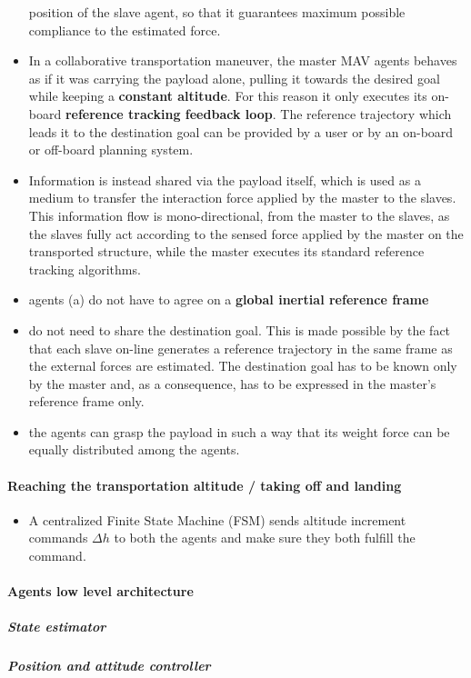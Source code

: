\documentclass{article}
\begin{document}
\begin{itemize}
			position of the slave agent, so that it guarantees maximum possible compliance to the estimated force.
			\item In a collaborative transportation maneuver, the master MAV agents behaves as if it was carrying the payload
			alone, pulling it towards the desired goal while keeping a \textbf{constant altitude}. For this reason it only executes its on-board \textbf{reference tracking feedback loop}. The reference trajectory which leads it to the destination goal can be provided by a user or by an on-board or off-board planning system.
			\item Information is instead shared via the payload itself, which is used as a medium to transfer the interaction force
			applied by the master to the slaves. This information flow is mono-directional, from the master to the slaves, as the slaves
			fully act according to the sensed force applied by the master on the transported structure, while the master executes its
			standard reference tracking algorithms.
			\item agents (a) do not have to agree on a \textbf{global inertial reference frame} 
			\item do not need to share the destination goal. This is made possible by the fact that each slave on-line generates
			a reference trajectory in the same frame as the external forces are estimated. The destination goal has to be known only by
			the master and, as a consequence, has to be expressed in the master’s reference frame only.
			
			\item the agents can grasp the payload in such a way that its weight force can be equally distributed among the
			agents.
			
		\end{itemize}
		\paragraph{Reaching the transportation altitude / taking off and landing}
			\begin{itemize}
				\item A centralized Finite State Machine (FSM) sends altitude increment commands $\Delta h$ to both the agents and make
				sure they both fulfill the command.
			\end{itemize}
		\paragraph{Agents low level architecture}
			\subparagraph{State estimator}
			\subparagraph{Position and attitude controller}
\end{document}
